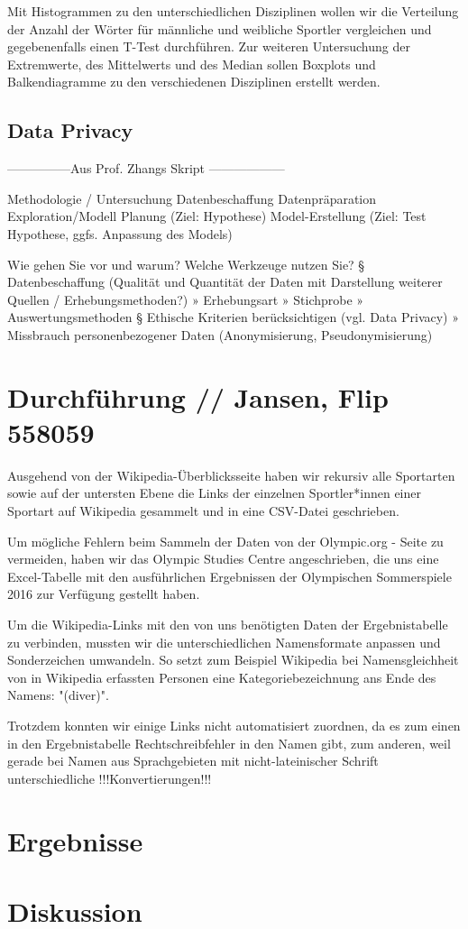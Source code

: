 \documentclass[11pt]{article}
\begin{document}
Mit Histogrammen zu den unterschiedlichen Disziplinen wollen wir die Verteilung der Anzahl der Wörter für männliche und weibliche Sportler vergleichen und gegebenenfalls einen T-Test durchführen. Zur weiteren Untersuchung der Extremwerte, des Mittelwerts und des Median sollen Boxplots und Balkendiagramme zu den verschiedenen Disziplinen erstellt werden.

\subsection*{Data Privacy}

---------------Aus Prof. Zhangs Skript ------------------

Methodologie / Untersuchung
    Datenbeschaffung
    Datenpräparation
    Exploration/Modell Planung (Ziel: Hypothese)
    Model-Erstellung (Ziel: Test Hypothese, ggfs. Anpassung des Models)
    
    Wie gehen Sie vor und warum? Welche Werkzeuge nutzen Sie?
§ Datenbeschaffung (Qualität und Quantität der Daten mit
Darstellung weiterer Quellen / Erhebungsmethoden?)
» Erhebungsart
» Stichprobe
» Auswertungsmethoden
§ Ethische Kriterien berücksichtigen (vgl. Data Privacy)
» Missbrauch personenbezogener Daten (Anonymisierung,
Pseudonymisierung)

\section {Durchführung // Jansen, Flip 558059}
Ausgehend von der Wikipedia-Überblicksseite \cite{wikiOlympicComp}haben wir rekursiv alle Sportarten sowie auf der untersten Ebene die Links der einzelnen Sportler*innen einer Sportart auf Wikipedia gesammelt und in eine CSV-Datei geschrieben. 

Um mögliche Fehlern beim Sammeln der Daten von der Olympic.org - Seite zu vermeiden, haben wir das Olympic Studies Centre angeschrieben, die uns eine Excel-Tabelle mit den ausführlichen Ergebnissen der Olympischen Sommerspiele 2016 zur Verfügung gestellt haben.

Um die Wikipedia-Links mit den von uns benötigten Daten der Ergebnistabelle zu verbinden, mussten wir die unterschiedlichen Namensformate anpassen und Sonderzeichen umwandeln. So setzt zum Beispiel Wikipedia bei Namensgleichheit von in Wikipedia erfassten Personen eine Kategoriebezeichnung ans Ende des Namens: "(diver)".

Trotzdem konnten wir einige Links nicht automatisiert zuordnen, da es zum einen in den Ergebnistabelle Rechtschreibfehler in den Namen gibt, zum anderen, weil gerade bei Namen aus Sprachgebieten mit nicht-lateinischer Schrift unterschiedliche !!!Konvertierungen!!!

\section {Ergebnisse}

\section {Diskussion}

\printbibliography
\end{document}
